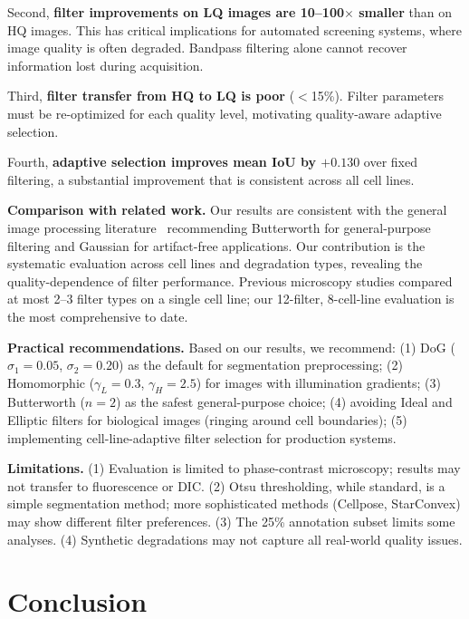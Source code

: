 \documentclass[11pt,a4paper]{article}
\begin{document}
Second, \textbf{filter improvements on LQ images are 10--100$\times$ smaller} than on HQ images. This has critical implications for automated screening systems, where image quality is often degraded. Bandpass filtering alone cannot recover information lost during acquisition.

Third, \textbf{filter transfer from HQ to LQ is poor} ($<$15\%). Filter parameters must be re-optimized for each quality level, motivating quality-aware adaptive selection.

Fourth, \textbf{adaptive selection improves mean IoU by $+0.130$} over fixed filtering, a substantial improvement that is consistent across all cell lines.

\textbf{Comparison with related work.} Our results are consistent with the general image processing literature~\cite{gonzalez2018digital} recommending Butterworth for general-purpose filtering and Gaussian for artifact-free applications. Our contribution is the systematic evaluation across cell lines and degradation types, revealing the quality-dependence of filter performance. Previous microscopy studies compared at most 2--3 filter types on a single cell line; our 12-filter, 8-cell-line evaluation is the most comprehensive to date.

\textbf{Practical recommendations.} Based on our results, we recommend: (1) DoG ($\sigma_1{=}0.05$, $\sigma_2{=}0.20$) as the default for segmentation preprocessing; (2) Homomorphic ($\gamma_L{=}0.3$, $\gamma_H{=}2.5$) for images with illumination gradients; (3) Butterworth ($n{=}2$) as the safest general-purpose choice; (4) avoiding Ideal and Elliptic filters for biological images (ringing around cell boundaries); (5) implementing cell-line-adaptive filter selection for production systems.

\textbf{Limitations.} (1) Evaluation is limited to phase-contrast microscopy; results may not transfer to fluorescence or DIC. (2) Otsu thresholding, while standard, is a simple segmentation method; more sophisticated methods (Cellpose, StarConvex) may show different filter preferences. (3) The 25\% annotation subset limits some analyses. (4) Synthetic degradations may not capture all real-world quality issues.

\section{Conclusion}
\label{sec:conclusion}
\end{document}
